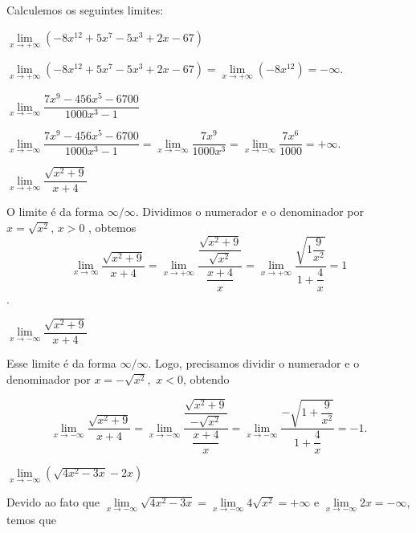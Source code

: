 \cleardoublepage\documentclass[../main.tex]{subfiles}
\begin{document}
\begin{exeresol}
  Calculemos os seguintes limites:
  \begin{compactenum}[a)]
  \item \(\lim\limits_{x \to +\infty} (-8x^{12}+5x^7-5x^3+2x-67)\)\\
  \begin{resol}
    \(\lim\limits_{x \to +\infty} (-8x^{12}+5x^7-5x^3+2x-67)=\lim\limits_{x \to +\infty} (-8x^{12})=-\infty\).
  \end{resol}
  \item \(\lim\limits_{x \to -\infty} \dfrac{7x^{9}-456x^5-6700}{1000x^3-1}\)\\
  \begin{resol}
    \(\lim\limits_{x \to -\infty} \dfrac{7x^{9}-456x^5-6700}{1000x^3-1}=\lim\limits_{x \to -\infty} \dfrac{7x^{9}}{1000x^3}=\lim\limits_{x \to -\infty} \dfrac{7x^{6}}{1000}=+\infty\).
  \end{resol}
\item \(\lim\limits_{x \to +\infty} \dfrac{\sqrt{x^2+9}}{x+4}\)\\ 
  \begin{resol}
    O limite é da forma \(\infty/\infty\). Dividimos o numerador e o denominador por \(x=\sqrt{x^2},\,x>0\) , obtemos \[\lim\limits_{x \to \infty} \dfrac{\sqrt{x^2+9}}{x+4}= \lim\limits_{x \to +\infty} \dfrac{\dfrac{\sqrt{x^2+9}}{\sqrt{x^2}}}{\dfrac{x+4}{x}} = \lim\limits_{x \to +\infty} \dfrac{\sqrt{1\dfrac{9}{x^2}}}{1+\dfrac{4}{x}}=1\].
  \end{resol}
  \item \(\lim\limits_{x \to -\infty} \dfrac{\sqrt{x^2+9}}{x+4}\)\\
  \begin{resol}
    Esse limite é da forma \(\infty/\infty\). Logo, precisamos dividir o numerador e o denominador por \(x=-\sqrt{x^2},\) \(x<0\), obtendo

\[ \lim\limits_{x \to -\infty} \dfrac{\sqrt{x^2+9}}{x+4}= \lim\limits_{x \to -\infty} \dfrac{\dfrac{\sqrt{x^2+9}}{-\sqrt{x^2}}}{\dfrac{x+4}{x}} = \lim\limits_{x \to -\infty} \dfrac{-\sqrt{1+\dfrac{9}{x^2}}}{1+\dfrac{4}{x}}=-1. \]
  \end{resol}
  \item \(\lim\limits_{x \to -\infty} (\sqrt{4x^2-3x}-2x)\)\\
  \begin{resol}
    Devido ao fato que \(\lim\limits_{x \to -\infty} \sqrt{4x^2-3x}= \lim\limits_{x \to -\infty} 4\sqrt{x^2}=+\infty\) e \(\lim\limits_{x \to -\infty} 2x=-\infty\), temos que


\end{resol}
\end{compactenum}
\end{exeresol}
\end{document}
